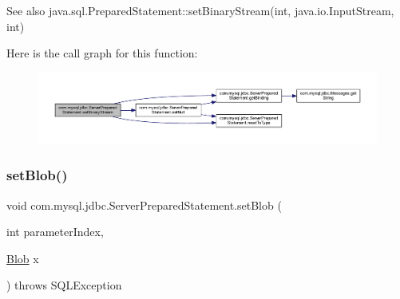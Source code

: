 \begin{DoxySeeAlso}{See also}
java.\+sql.\+Prepared\+Statement\+::set\+Binary\+Stream(int, java.\+io.\+Input\+Stream, int) 
\end{DoxySeeAlso}
Here is the call graph for this function\+:
\nopagebreak
\begin{figure}[H]
\begin{center}
\leavevmode
\includegraphics[width=350pt]{classcom_1_1mysql_1_1jdbc_1_1_server_prepared_statement_a7b5f9403670d9b795ba1a1e269d3ef2a_cgraph}
\end{center}
\end{figure}
\mbox{\label{classcom_1_1mysql_1_1jdbc_1_1_server_prepared_statement_ac1ab0464fd52487c1de67189168331da}} 
\subsubsection{\texorpdfstring{set\+Blob()}{setBlob()}}
{\footnotesize\ttfamily void com.\+mysql.\+jdbc.\+Server\+Prepared\+Statement.\+set\+Blob (\begin{DoxyParamCaption}\item[{int}]{parameter\+Index,  }\item[{\mbox{\hyperlink{classcom_1_1mysql_1_1jdbc_1_1_blob}{Blob}}}]{x }\end{DoxyParamCaption}) throws S\+Q\+L\+Exception}

